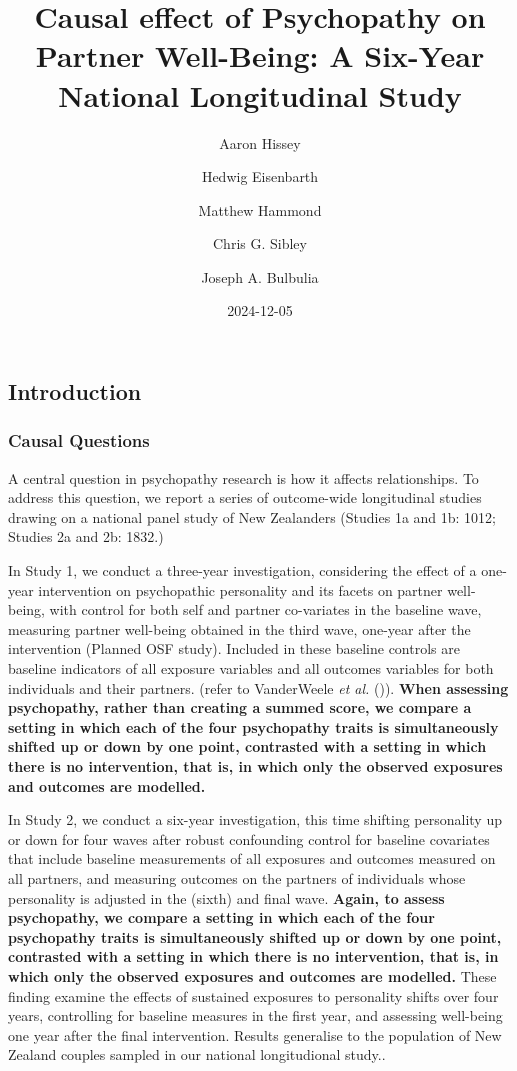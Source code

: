 \documentclass[
  single column]{article}
\title{Causal effect of Psychopathy on Partner Well-Being: A Six-Year
National Longitudinal Study}
\author{Aaron Hissey}
\affil{%
             \small{     Victoria University of Wellington, New Zealand
          ORCID \textcolor[HTML]{A6CE39}{\aiOrcid} ~ }
              }
\author{Hedwig Eisenbarth}
\affil{%
             \small{     Victoria University of Wellington, New Zealand
          ORCID \textcolor[HTML]{A6CE39}{\aiOrcid} ~ }
              }
\author{Matthew Hammond}
\affil{%
             \small{     School of Psychology, University of Auckland
          ORCID \textcolor[HTML]{A6CE39}{\aiOrcid} ~ }
              }
\author{Chris G. Sibley}
\affil{%
             \small{     School of Psychology, University of Auckland
          ORCID \textcolor[HTML]{A6CE39}{\aiOrcid} ~ }
              }
\author{Joseph A. Bulbulia}
\affil{%
             \small{     Victoria University of Wellington, New Zealand
          ORCID \textcolor[HTML]{A6CE39}{\aiOrcid} ~ }
              }
\date{2024-12-05}
\begin{document}
\maketitle


\subsection{Introduction}\label{introduction}

\subsubsection{Causal Questions}\label{causal-questions}

A central question in psychopathy research is how it affects
relationships. To address this question, we report a series of
outcome-wide longitudinal studies drawing on a national panel study of
New Zealanders (Studies 1a and 1b: 1012; Studies 2a and 2b: 1832.)

In Study 1, we conduct a three-year investigation, considering the
effect of a one-year intervention on psychopathic personality and its
facets on partner well-being, with control for both self and partner
co-variates in the baseline wave, measuring partner well-being obtained
in the third wave, one-year after the intervention (Planned OSF study).
Included in these baseline controls are baseline indicators of all
exposure variables and all outcomes variables for both individuals and
their partners. (refer to VanderWeele \emph{et al.}
()). \textbf{When assessing
psychopathy, rather than creating a summed score, we compare a setting
in which each of the four psychopathy traits is simultaneously shifted
up or down by one point, contrasted with a setting in which there is no
intervention, that is, in which only the observed exposures and outcomes
are modelled.}

In Study 2, we conduct a six-year investigation, this time shifting
personality up or down for four waves after robust confounding control
for baseline covariates that include baseline measurements of all
exposures and outcomes measured on all partners, and measuring outcomes
on the partners of individuals whose personality is adjusted in the
(sixth) and final wave. \textbf{Again, to assess psychopathy, we compare
a setting in which each of the four psychopathy traits is simultaneously
shifted up or down by one point, contrasted with a setting in which
there is no intervention, that is, in which only the observed exposures
and outcomes are modelled.} These finding examine the effects of
sustained exposures to personality shifts over four years, controlling
for baseline measures in the first year, and assessing well-being one
year after the final intervention. Results generalise to the population
of New Zealand couples sampled in our national longitudional study..
\end{document}
